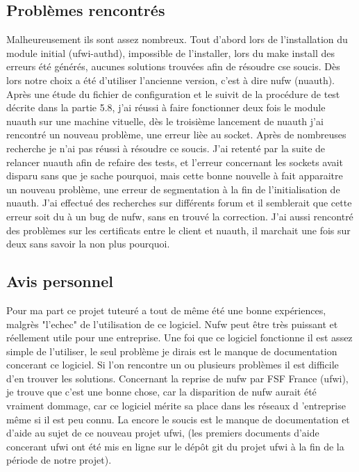 \documentclass[12pt]{report}
\begin{document}
\begin{itemize}
\subsection{Problèmes rencontrés}
Malheureusement ils sont assez nombreux. Tout d'abord lors de l'installation du module initial (ufwi-authd), impossible de 
l'installer, lors du make install des erreurs été générés, aucunes solutions trouvées afin de résoudre cse soucis. Dès lors notre
choix a été d'utiliser l'ancienne version, c'est à dire nufw (nuauth). Après une étude du fichier de configuration et le suivit
de la procédure de test décrite dans la partie 5.8, j'ai réussi à faire fonctionner deux fois le module nuauth sur une machine 
vituelle, dès le troisième lancement de nuauth j'ai rencontré un nouveau problème, une erreur lièe au socket. Après de 
nombreuses recherche je n'ai pas réussi à résoudre ce soucis. J'ai retenté par la suite de relancer nuauth afin de refaire des 
tests, et l'erreur concernant les sockets avait disparu sans que je sache pourquoi, mais cette bonne nouvelle à fait 
apparaitre un nouveau problème, une erreur de segmentation à la fin de l'initialisation de nuauth. J'ai effectué des 
recherches sur différents forum et il semblerait que cette erreur soit du à un bug de nufw, sans en trouvé la correction.
J'ai aussi rencontré des problèmes sur les certificats entre le client et nuauth, il marchait une fois sur deux sans savoir 
la non plus pourquoi.
\subsection{Avis personnel}
Pour ma part ce projet tuteuré a tout de même été une bonne expériences, malgrès "l'echec" de l'utilisation de ce logiciel. 
Nufw peut être très puissant et réellement utile pour une entreprise. Une foi que ce logiciel fonctionne il est assez 
simple de l'utiliser, le seul problème je dirais est le manque de documentation concerant ce logiciel. Si l'on rencontre un 
ou plusieurs problèmes il est difficile d'en trouver les solutions.
Concernant la reprise de nufw par FSF France (ufwi), je trouve que c'est une bonne chose, car la disparition de nufw aurait 
été vraiment dommage, car ce logiciel mérite sa place dans les réseaux d 'entreprise même si il est peu connu. La encore le soucis est le 
manque de documentation et d'aide au sujet de ce nouveau projet ufwi, (les premiers documents d'aide concerant ufwi ont été 
mis en ligne sur le dépôt git du projet ufwi à la fin de la période de notre projet).


\end{itemize}
\end{document}
